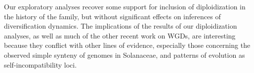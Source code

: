 

Our exploratory analyses recover some support for inclusion of diploidization in the history of the family, but without significant effects on inferences of diversification dynamics.
The implications of the results of our diploidization analyses, as well as much of the other recent work on WGDs, are interesting because they conflict with other lines of evidence, especially those concerning the observed simple synteny of genomes in Solanaceae, and patterns of evolution as self-incompatibility loci.

